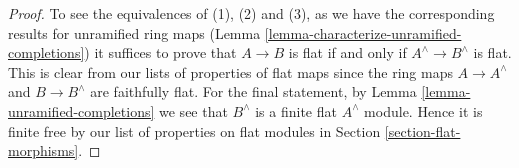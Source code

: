 \documentclass[10pt,a4paper]{amsart}
\theoremstyle{plain}
\theoremstyle{definition}
\theoremstyle{remark}
\numberwithin{equation}{subsection}
\begin{document}
\begin{proof}
To see the equivalences of (1), (2) and (3), as we have the corresponding
results for unramified ring maps
(Lemma \ref{lemma-characterize-unramified-completions})
it suffices to prove that
$A \to B$ is flat if and only if $A^\wedge \to B^\wedge$ is flat.
This is clear from our lists of properties of flat maps since
the ring maps $A \to A^\wedge$ and $B \to B^\wedge$ are faithfully flat.
For the final statement, by Lemma \ref{lemma-unramified-completions}
we see that $B^\wedge$ is a finite flat $A^\wedge$ module.
Hence it is finite free by our list
of properties on flat modules in Section \ref{section-flat-morphisms}.
\end{proof}
\end{document}
